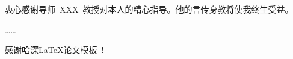 
\begin{acknowledgements}
衷心感谢导师~XXX~教授对本人的精心指导。他的言传身教将使我终生受益。

……

感谢哈深\LaTeX{}论文模板\hitszthesis\ !

\end{acknowledgements}
